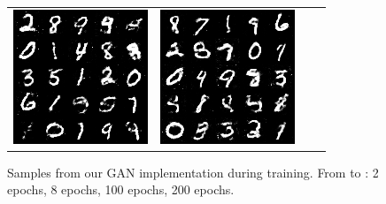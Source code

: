 \documentclass{article}
\begin{document}
\begin{figure}
\begin{tabularx}{\linewidth}{XXXX}
    \includegraphics[width=\linewidth]{assignment_3/code/figures/gan_94000.png} &
    \includegraphics[width=\linewidth]{assignment_3/code/figures/gan_185000.png}
  \end{tabularx}

  \caption{Samples from our GAN implementation during training. From  to : 2 epochs, 8 epochs, 100 epochs, 200 epochs.}
  \label{fig:gan_samples}
\end{figure}
\end{document}
